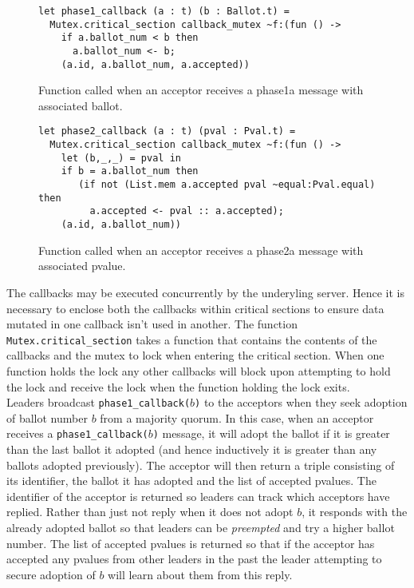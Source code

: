 \begin{figure}
  \begin{lstlisting}
let phase1_callback (a : t) (b : Ballot.t) =
  Mutex.critical_section callback_mutex ~f:(fun () ->
    if a.ballot_num < b then
      a.ballot_num <- b;
    (a.id, a.ballot_num, a.accepted))
\end{lstlisting}
  \centering
  \caption{Function called when an acceptor receives a phase1a message with associated ballot.}
  \label{fig:acceptor-phase1}

  \begin{lstlisting}
let phase2_callback (a : t) (pval : Pval.t) =
  Mutex.critical_section callback_mutex ~f:(fun () ->
    let (b,_,_) = pval in
    if b = a.ballot_num then
       (if not (List.mem a.accepted pval ~equal:Pval.equal) then
         a.accepted <- pval :: a.accepted);
    (a.id, a.ballot_num))
  \end{lstlisting}
  \centering
  \caption{Function called when an acceptor receives a phase2a message with associated pvalue.}
  \label{fig:acceptor-phase2}
\end{figure}

The callbacks may be executed concurrently by the underyling server. Hence it is necessary to enclose both the callbacks within critical sections to ensure data mutated in one callback isn't used in another. The function \texttt{Mutex.critical\_section} takes a function that contains the contents of the callbacks and the mutex to lock when entering the critical section. When one function holds the lock any other callbacks will block upon attempting to hold the lock and receive the lock when the function holding the lock exits. \\

Leaders broadcast \texttt{phase1\_callback($b$)} to the acceptors when they seek adoption of ballot number $b$ from a majority quorum. In this case, when an acceptor receives a \texttt{phase1\_callback($b$)} message, it will adopt the ballot if it is greater than the last ballot it adopted (and hence inductively it is greater than any ballots adopted previously). The acceptor will then return a triple consisting of its identifier, the ballot it has adopted and the list of accepted pvalues. The identifier of the acceptor is returned so leaders can track which acceptors have replied. Rather than just not reply when it does not adopt $b$, it responds with the already adopted ballot so that leaders can be \emph{preempted} and try a higher ballot number. The list of accepted pvalues is returned so that if the acceptor has accepted any pvalues from other leaders in the past the leader attempting to secure adoption of $b$ will learn about them from this reply. \\

